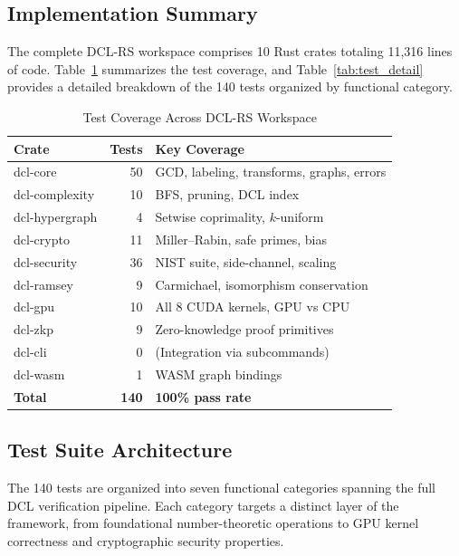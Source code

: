 \documentclass[lettersize,journal]{IEEEtran}
\begin{document}
\subsection{Implementation Summary}

The complete DCL-RS workspace comprises 10 Rust crates totaling 11{,}316 lines of code. Table~\ref{tab:tests} summarizes the test coverage, and Table~\ref{tab:test_detail} provides a detailed breakdown of the 140 tests organized by functional category.

\begin{table}[!t]
\caption{Test Coverage Across DCL-RS Workspace\label{tab:tests}}
\centering
\begin{tabular}{@{}lrl@{}}
\toprule
\textbf{Crate} & \textbf{Tests} & \textbf{Key Coverage} \\
\midrule
dcl-core        & 50 & GCD, labeling, transforms, graphs, errors \\
dcl-complexity  & 10 & BFS, pruning, DCL index \\
dcl-hypergraph  & 4  & Setwise coprimality, $k$-uniform \\
dcl-crypto      & 11 & Miller--Rabin, safe primes, bias \\
dcl-security    & 36 & NIST suite, side-channel, scaling \\
dcl-ramsey      & 9  & Carmichael, isomorphism conservation \\
dcl-gpu         & 10 & All 8 CUDA kernels, GPU vs CPU \\
dcl-zkp         & 9  & Zero-knowledge proof primitives \\
dcl-cli         & 0  & (Integration via subcommands) \\
dcl-wasm        & 1  & WASM graph bindings \\
\midrule
\textbf{Total}  & \textbf{140} & \textbf{100\% pass rate} \\
\bottomrule
\end{tabular}
\end{table}

\subsection{Test Suite Architecture}
\label{sec:testsuite}

The 140 tests are organized into seven functional categories spanning the full DCL verification pipeline. Each category targets a distinct layer of the framework, from foundational number-theoretic operations to GPU kernel correctness and cryptographic security properties.
\end{document}
